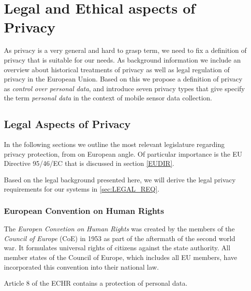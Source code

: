 \chapter{Legal and Ethical aspects of Privacy}
\label{chap:privacy}

\newcommand{\om}{[...]\xspace} %

As privacy is a very general and hard to grasp term, we need to fix a definition of privacy that is suitable for our needs.
As background information we include an overview about historical treatments of privacy as well as legal regulation of privacy in the European Union.
Based on this we propose a definition of privacy as {\em control over personal data}, and introduce seven privacy types that give specify the term {\em personal data} in the context of mobile sensor data collection.


\section{Legal Aspects of Privacy}

In the following sections we outline the most relevant legislature regarding privacy protection,
from on European angle.
Of particular importance is the EU Directive 95/46/EC that is discussed in section \ref{EUDIR}.

Based on the legal background presented here, we will derive the legal privacy requirements for our systems in \ref{sec:LEGAL_REQ}.

\subsection{European Convention on Human Rights}

The \emph{Europen Convetion on Human Rights} \cite{ECHR} was created by the members of the \emph{Council of Europe} (CoE) in 1953 as part of the aftermath of the second world war.
It formulates universal rights of citizens against the state authority.
All member states of the Council of Europe, which includes all EU members, have incorporated this convention into their national law.

Article 8 of the ECHR contains a protection of personal data.

